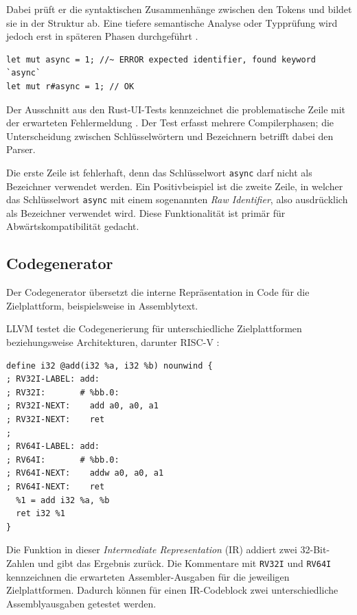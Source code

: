 \documentclass[11pt,a4paper]{article}
\begin{document}
Dabei prüft er die syntaktischen Zusammenhänge zwischen den Tokens und bildet sie in der Struktur ab. Eine tiefere semantische Analyse oder Typprüfung wird jedoch erst in späteren Phasen durchgeführt \parencite{clang}.

\begin{lstlisting}[caption={Auszug aus einem Rust-UI-Test für Schlüsselwörter}]
let mut async = 1; //~ ERROR expected identifier, found keyword `async`
let mut r#async = 1; // OK
\end{lstlisting}

Der Ausschnitt aus den Rust-UI-Tests kennzeichnet die problematische Zeile mit der erwarteten Fehlermeldung \parencite{rust_parsing_keywords,rust_ui_tests}. Der Test erfasst mehrere Compilerphasen; die Unterscheidung zwischen Schlüsselwörtern und Bezeichnern betrifft dabei den Parser. 

Die erste Zeile ist fehlerhaft, denn das Schlüsselwort \texttt{async} darf nicht als Bezeichner verwendet werden. Ein Positivbeispiel ist die zweite Zeile, in welcher das Schlüsselwort \texttt{async} mit einem sogenannten \emph{Raw Identifier}, also ausdrücklich als Bezeichner verwendet wird. Diese Funktionalität ist primär für Abwärtskompatibilität gedacht.

\subsection{Codegenerator}\label{sec:codegenerator}

Der Codegenerator übersetzt die interne Repräsentation in Code für die Zielplattform, beispielsweise in Assemblytext.

LLVM testet die Codegenerierung für unterschiedliche Zielplattformen beziehungsweise Architekturen, darunter RISC-V \parencite{rvtest}:

\begin{lstlisting}[caption={LLVM-Additionsfunktion mit RV32I- und RV64I-Prüfmustern}]
define i32 @add(i32 %a, i32 %b) nounwind {
; RV32I-LABEL: add:
; RV32I:       # %bb.0:
; RV32I-NEXT:    add a0, a0, a1
; RV32I-NEXT:    ret
;
; RV64I-LABEL: add:
; RV64I:       # %bb.0:
; RV64I-NEXT:    addw a0, a0, a1
; RV64I-NEXT:    ret
  %1 = add i32 %a, %b
  ret i32 %1
}
\end{lstlisting}

Die Funktion in dieser \emph{Intermediate Representation} (IR) addiert zwei 32-Bit-Zahlen und gibt das Ergebnis zurück. Die Kommentare mit \texttt{RV32I} und \texttt{RV64I} kennzeichnen die erwarteten Assembler-Ausgaben für die jeweiligen Zielplattformen. Dadurch können für einen IR-Codeblock zwei unterschiedliche Assemblyausgaben getestet werden.
\end{document}
